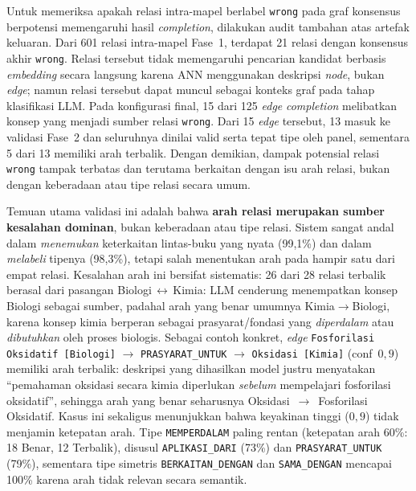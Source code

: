 \documentclass[../../thesis]{subfiles}
\begin{document}
Untuk memeriksa apakah relasi intra-mapel berlabel \texttt{wrong} pada graf
konsensus berpotensi memengaruhi hasil \textit{completion}, dilakukan audit
tambahan atas artefak keluaran. Dari 601 relasi intra-mapel Fase~1, terdapat 21
relasi dengan konsensus akhir \texttt{wrong}. Relasi tersebut tidak memengaruhi
pencarian kandidat berbasis \textit{embedding} secara langsung karena ANN
menggunakan deskripsi \textit{node}, bukan \textit{edge}; namun relasi tersebut
dapat muncul sebagai konteks graf pada tahap klasifikasi LLM. Pada konfigurasi
final, 15 dari 125 \textit{edge} \textit{completion} melibatkan konsep yang
menjadi sumber relasi \texttt{wrong}. Dari 15 \textit{edge} tersebut, 13 masuk
ke validasi Fase~2 dan seluruhnya dinilai valid serta tepat tipe oleh panel,
sementara 5 dari 13 memiliki arah terbalik. Dengan demikian, dampak potensial
relasi \texttt{wrong} tampak terbatas dan terutama berkaitan dengan isu arah
relasi, bukan dengan keberadaan atau tipe relasi secara umum.

Temuan utama validasi ini adalah bahwa \textbf{arah relasi merupakan
sumber kesalahan dominan}, bukan keberadaan atau tipe relasi. Sistem
sangat andal dalam \textit{menemukan} keterkaitan lintas-buku yang nyata
(99{,}1\%) dan dalam \textit{melabeli} tipenya (98{,}3\%), tetapi salah
menentukan arah pada hampir satu dari empat relasi. Kesalahan arah ini
bersifat sistematis: 26 dari 28 relasi terbalik berasal dari pasangan
Biologi\,$\leftrightarrow$\,Kimia: LLM cenderung menempatkan konsep
Biologi sebagai sumber, padahal arah yang benar umumnya
Kimia$\to$Biologi, karena konsep kimia berperan sebagai prasyarat/fondasi
yang \textit{diperdalam} atau \textit{dibutuhkan} oleh proses biologis.
Sebagai contoh konkret, \textit{edge} \texttt{Fosforilasi Oksidatif [Biologi]}
$\to$ \texttt{PRASYARAT\_UNTUK} $\to$ \texttt{Oksidasi [Kimia]} (conf~$0{,}9$)
memiliki arah terbalik: deskripsi yang dihasilkan model justru menyatakan
``pemahaman oksidasi secara kimia diperlukan \emph{sebelum} mempelajari
fosforilasi oksidatif'', sehingga arah yang benar seharusnya
Oksidasi~$\to$~Fosforilasi Oksidatif. Kasus ini sekaligus menunjukkan bahwa
keyakinan tinggi ($0{,}9$) tidak menjamin ketepatan arah.
Tipe \texttt{MEMPERDALAM} paling rentan (ketepatan arah 60\%: 18 Benar, 12
Terbalik), disusul \texttt{APLIKASI\_DARI} (73\%) dan
\texttt{PRASYARAT\_UNTUK} (79\%),
sementara tipe simetris \texttt{BERKAITAN\_DENGAN} dan \texttt{SAMA\_DENGAN} mencapai
100\% karena arah tidak relevan secara semantik.
\end{document}
